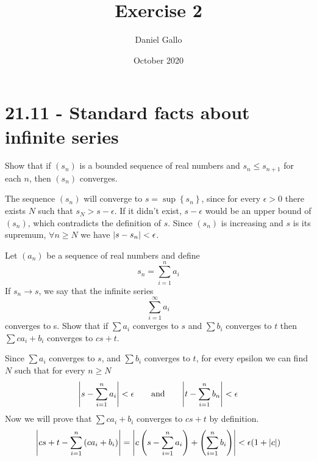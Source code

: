 \documentclass{article}
\title{Exercise 2}
\author{Daniel Gallo}
\date{October 2020}
\DeclarePairedDelimiter\abs{\lvert}{\rvert}%
\begin{document}
    \maketitle
    \section*{21.11 - Standard facts about infinite series}
    \begin{tcolorbox}[title=Exercise a]
        Show that if $(s_n)$ is a bounded sequence of real numbers and $s_n \leq s_{n + 1}$ for each $n$, then $(s_n)$ converges.
    \end{tcolorbox}
    \noindent
    The sequence $(s_n)$ will converge to $s = \sup\left\{s_n\right\}$, since for every $\epsilon > 0$ there exists $N$ such that $s_N > s - \epsilon$. If it didn't exist, $s - \epsilon$ would be an upper bound of $(s_n)$, which contradicts the definition of $s$. Since $(s_n)$ is increasing and $s$ is its supremum, $\forall n \geq N$ we have $\abs{s - s_n} < \epsilon$.
    \begin{tcolorbox}[title=Exercise b]
        Let $(a_n)$ be a sequence of real numbers and define
        \begin{equation*}
            s_n = \sum_{i=1}^n{a_i}
        \end{equation*}
        If $s_n \rightarrow s$, we say that the infinite series
        \begin{equation*}
            \sum_{i=1}^\infty{a_i}
        \end{equation*}
        converges to s. Show that if $\sum{a_i}$ converges to $s$ and $\sum{b_i}$ converges to $t$ then $\sum{ca_i + b_i}$ converges to $cs + t$.
    \end{tcolorbox}
    \noindent
    Since $\sum{a_i}$ converges to $s$, and $\sum{b_i}$ converges to $t$, for every epsilon we can find $N$ such that for every $n \geq N$
    \begin{equation*}
        \abs*{s - \sum_{i=1}^n{a_i}} < \epsilon \qquad \text{and} \qquad \abs*{t - \sum_{i=1}^n{b_n}} < \epsilon
    \end{equation*}
    Now we will prove that $\sum{ca_i + b_i}$ converges to $cs + t$ by definition.
    \begin{equation*}
        \abs*{cs+t - \sum_{i=1}^n{\left(ca_i + b_i\right)}} = \abs*{c\left(s - \sum_{i=1}^n{a_i}\right) + \left(\sum_{i=1}^n{b_i}\right)} < \epsilon(1 + \abs{c})
    \end{equation*}
\end{document}
